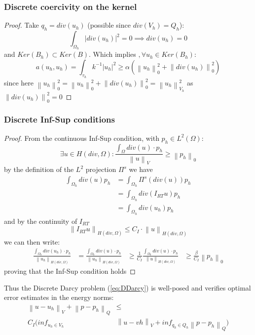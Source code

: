 \documentclass[conference]{IEEEtran}
\newcommand{\norm}[1]{\left\lVert#1\right\rVert}
\begin{document}
\subsubsection{Discrete coercivity on the kernel}
\begin{proof}
Take $q_h = div(u_h)$ (possible since $div(V_h)=Q_h$):
$$ \int_{\Omega_h} |div(u_h)|^2 = 0 \implies div(u_h) = 0 $$
and $Ker(B_h)\subset Ker(B)$.
Which implies $, \forall u_h \in Ker(B_h)$:
\begin{equation}
 a(u_h,u_h)=\int_{\tau_h} k^{-1} |u_h|^2 \geq \alpha (\norm{u_h}^2_0 + \norm{div(u_h)}^2_0)  
\end{equation}
since here $\norm{u_h}^2_0 = \norm{u_h}^2_0 + \norm{div(u_h)}^2_0 = \norm{u_h}^2_{V_h}$ as $\norm{div(u_h)}^2_0 = 0$
\end{proof}
\subsubsection{Discrete Inf-Sup conditions}
\begin{proof}
From the continuous Inf-Sup condition, with $p_h \in L^2(\Omega)$:
\begin{equation*}
	\exists u \in H(div,\Omega) : \frac{ \int_{\Omega} div(u)\cdot p_h}{\norm{u}_V} \geq  \norm{p_h}_0
\end{equation*}
by the definition of the $L^2$ projection $\Pi^s$ we have
\begin{align*}
	\int_{\Omega_h} div(u) p_h &= \int_{\Omega_h}\Pi^s(div(u))p_h \\
	&=\int_{\Omega_h} div(I_{RT} u) p_h \\
	&=\int_{\Omega_h} div(u_h) p_h
\end{align*}
and by the continuity of $I_{RT}$
\begin{equation*}
	\norm{I_{RT}u}_{H(div,\Omega)} \leq C_I \cdot \norm{u}_{H(div,\Omega)}
\end{equation*}
we can then write:
\begin{align*}
	 \frac{ \int_{\Omega_h} div(u_h)\cdot p_h}{\norm{u_h}_{H(div,\Omega)}}
	 &= \frac{ \int_{\Omega_h} div(u)\cdot p_h}{\norm{u_h}_{H(div,\Omega)}}
	 & \geq \frac{1}{C_I} \frac{ \int_{\Omega_h} div(u)\cdot p_h}{\norm{u}_{H(div,\Omega)}}
	 & \geq \frac{\beta}{C_I} \norm{p_h}_0
\end{align*}
proving that the Inf-Sup condition holds
\end{proof}

Thus the Discrete Darcy problem (\ref{eq:DDarcy}) is well-posed and verifies optimal error estimates in the energy norms:
\begin{align*}
	\norm{u-u_h}_V + \norm{p-p_h}_Q &\leq \\
	 C_{I} (inf_{u_h \in V_h}&\norm{u-vh}_V + inf_{q_h \in Q_h}\norm{p-p_h}_Q)
\end{align*}
\end{document}
